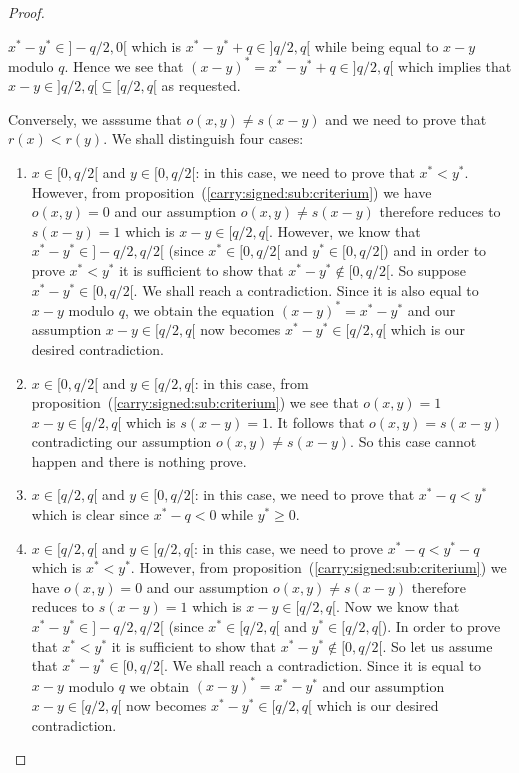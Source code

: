 \documentclass{article}
\begin{document}
\begin{proof}
\begin{enumerate}
      $x^{*}-y^{*}\in]-q/2,0[$ which is $x^{*}-y^{*}+q\in]q/2,q[$
      while being equal to $x-y$ modulo $q$. Hence we see that
      $(x-y)^{*}=x^{*}-y^{*}+q\in]q/2,q[$ which implies that
      $x-y\in]q/2,q[\subseteq[q/2,q[$ as requested.
  \end{enumerate}
  Conversely, we asssume that $o(x,y)\neq s(x-y)$ and we need to prove
  that $r(x)<r(y)$. We shall distinguish four cases:
    \begin{enumerate}
      \item $x\in[0,q/2[$ and $y\in[0,q/2[$: in this case, we need to prove 
        that $x^{*}<y^{*}$. However, from 
        proposition~(\ref{carry:signed:sub:criterium}) we have $o(x,y)=0$
        and our assumption $o(x,y)\neq s(x-y)$ therefore reduces to 
        $s(x-y)=1$ which is $x-y\in[q/2,q[$. However, we know that 
        $x^{*}-y^{*}\in]-q/2,q/2[$ (since $x^{*}\in[0,q/2[$ and 
        $y^{*}\in[0,q/2[$) and in order to prove $x^{*}<y^{*}$ it is 
        sufficient to show that $x^{*}-y^{*}\not\in[0,q/2[$. So
        suppose $x^{*}-y^{*}\in[0,q/2[$. We shall reach a contradiction.
        Since it is also equal to $x-y$ modulo $q$, we obtain
        the equation $(x-y)^{*}=x^{*}-y^{*}$  and our assumption 
        $x-y\in[q/2,q[$ now becomes $x^{*}-y^{*}\in[q/2,q[$ which 
        is our desired contradiction.
      \item $x\in[0,q/2[$ and $y\in[q/2,q[$: in this case, from
        proposition~(\ref{carry:signed:sub:criterium}) we see that 
        $o(x,y)=1$ \ifand\ $x-y\in[q/2,q[$ which is $s(x-y)=1$. It 
        follows that $o(x,y)=s(x-y)$ contradicting our assumption
        $o(x,y)\neq s(x-y)$. So this case cannot happen and there 
        is nothing prove.
      \item $x\in[q/2,q[$ and $y\in[0,q/2[$: in this case, we need
        to prove that $x^{*}-q < y^{*}$ which is clear since $x^{*}-q <0$
        while $y^{*}\geq 0$.
      \item $x\in[q/2,q[$ and $y\in[q/2,q[$: in this case, we need to 
        prove $x^{*}-q < y^{*}-q$ which is $x^{*}<y^{*}$. However,
        from proposition~(\ref{carry:signed:sub:criterium}) we have
        $o(x,y)=0$ and our assumption $o(x,y)\neq s(x-y)$ therefore
        reduces to $s(x-y)=1$ which is $x-y\in[q/2,q[$. Now we know
        that $x^{*}-y^{*}\in]-q/2,q/2[$ (since $x^{*}\in[q/2,q[$
        and $y^{*}\in[q/2,q[$). In order to prove that $x^{*}<y^{*}$
        it is sufficient to show that $x^{*}-y^{*}\not\in[0,q/2[$.
        So let us assume that $x^{*}-y^{*}\in[0,q/2[$. We shall
        reach a contradiction. Since it is equal to $x-y$ modulo
        $q$ we obtain $(x-y)^{*}=x^{*}-y^{*}$ and our assumption
        $x-y\in[q/2,q[$ now becomes $x^{*}-y^{*}\in[q/2,q[$ which is
        our desired contradiction.
    \end{enumerate}
\end{proof}
\end{document}
